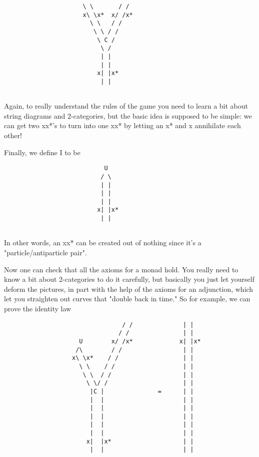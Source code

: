                      
\begin{verbatim}
                      \ \       / /
                      x\ \x*  x/ /x*
                        \ \   / /
                         \ \ / /
                          \ C /
                           \ /
                           | |
                           | |
                          x| |x*
                           | |


\end{verbatim}
    
Again, to really understand the rules of the game you need to learn
a bit about string diagrams and 2-categories, but the basic idea is
supposed to be simple: we can get two xx*'s to turn into one
xx* by letting an x* and x annihilate each other!  

Finally, we define I to be
                     
\begin{verbatim}
                            U
                           / \
                           | |
                           | |
                           | |
                          x| |x*
                           | |


\end{verbatim}
    
In other words, an xx* can be created out of nothing since it's
a "particle/antiparticle pair".  

Now one can check that all the axioms for a monad hold.  You
really need to know a bit about 2-categories to do it carefully,
but basically you just let yourself deform the pictures, in part
with the help of the axioms for an adjunction, which let you
straighten out curves that "double back in time."  So for example, 
we can prove the identity law

\begin{verbatim}
                                 / /              | |
                                / /               | |
                     U        x/ /x*             x| |x*
                    /\        / /                 | |
                   x\ \x*    / /                  | |
                     \ \    / /                   | |
                      \ \  / /                    | |
                       \ \/ /                     | |
                        |C |               =      | |
                        |  |                      | |
                        |  |                      | |
                        |  |                      | |
                        |  |                      | |
                        |  |                      | |
                       x|  |x*                    | |
                        |  |                      | |


\end{verbatim}
    
